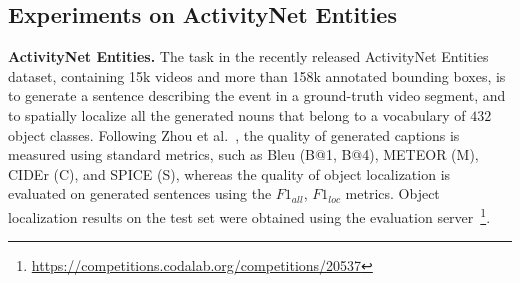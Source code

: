 \documentclass[runningheads]{llncs}
\begin{document}
\subsection{Experiments on ActivityNet Entities}
\textbf{ActivityNet Entities.} The task in the recently released ActivityNet Entities~\cite{Zhou:CVPR19} dataset, containing 15k videos and more than 158k annotated bounding boxes, is to generate a sentence describing the event in a ground-truth video segment, and to spatially localize all the generated nouns that belong to a vocabulary of $432$ object classes. Following Zhou et al.~\cite{Zhou:CVPR19}, the quality of generated captions is measured using standard metrics, such as Bleu (B@1, B@4), METEOR (M), CIDEr (C), and SPICE (S), whereas the quality of object localization is evaluated on generated sentences using the $F1_{all}$, $F1_{loc}$  metrics. Object localization results on the test set were obtained using the evaluation server~\footnote{\url{https://competitions.codalab.org/competitions/20537}}.
\label{subsec:activitynet}
\begin{table}[t]
\caption{\textbf{Grounded video description results on ActivityNet Entities~\cite{Zhou:CVPR19}}. MHA: multi-head self-attention. SCM-VG: our semantic context module with visual-to-symbolic node correspondences pre-trained on Visual Genome.}
\centering
{}
\label{tab:activitynet}
\end{table}
\end{document}
